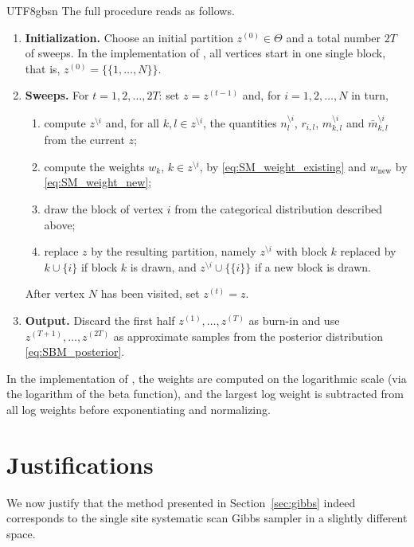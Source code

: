 \documentclass[12pt]{report}
\theoremstyle{plain}
\theoremstyle{definition}
\begin{document}
\begin{CJK*}{UTF8}{gbsn}
The full procedure reads as follows.
\begin{enumerate}
  \item \textbf{Initialization.} Choose an initial partition $z^{(0)} \in \Theta$
  and a total number $2T$ of sweeps.
  In the implementation of \cite{Schmidt_Morup_2013},
  all vertices start in one single block, that is, $z^{(0)} = \{\{1, \ldots, N\}\}$.
  \item \textbf{Sweeps.} For $t = 1, 2, \ldots, 2T$:
  set $z = z^{(t-1)}$ and, for $i = 1, 2, \ldots, N$ in turn,
  \begin{enumerate}
    \item compute $z^{\setminus i}$ and, for all $k, l \in z^{\setminus i}$,
    the quantities $n_l^{\setminus i}$, $r_{i,l}$, $m_{k,l}^{\setminus i}$ and $\bar{m}_{k,l}^{\setminus i}$
    from the current $z$;
    \item compute the weights $w_k$, $k \in z^{\setminus i}$, by \eqref{eq:SM_weight_existing}
    and $w_{\text{new}}$ by \eqref{eq:SM_weight_new};
    \item draw the block of vertex $i$ from the categorical distribution described above;
    \item replace $z$ by the resulting partition, namely
    $z^{\setminus i}$ with block $k$ replaced by $k \cup \{i\}$ if block $k$ is drawn,
    and $z^{\setminus i} \cup \{\{i\}\}$ if a new block is drawn.
  \end{enumerate}
  After vertex $N$ has been visited, set $z^{(t)} = z$.
  \item \textbf{Output.} Discard the first half $z^{(1)}, \ldots, z^{(T)}$ as burn-in
  and use $z^{(T+1)}, \ldots, z^{(2T)}$ as approximate samples
  from the posterior distribution \eqref{eq:SBM_posterior}.
\end{enumerate}
In the implementation of \cite{Schmidt_Morup_2013},
the weights are computed on the logarithmic scale (via the logarithm of the beta function),
and the largest log weight is subtracted from all log weights
before exponentiating and normalizing.




\section{Justifications}

We now justify that the method presented in 
Section~\ref{sec:gibbs} indeed corresponds 
to the single site systematic scan Gibbs sampler
in a slightly different space.


\end{CJK*}
\end{document}
